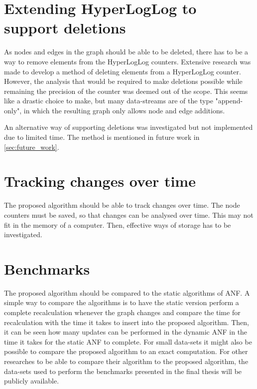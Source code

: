 \section{Extending HyperLogLog to support deletions}
As nodes and edges in the graph should be able to be deleted, there has to be a way to remove elements from the HyperLogLog counters. Extensive research was made to develop a method of deleting elements from a HyperLogLog counter. However, the analysis that would be required to make deletions possible while remaining the precision of the counter was deemed out of the scope. This seems like a drastic choice to make, but many data-streams are of the type "append-only", in which the resulting graph only allows node and edge additions.

An alternative way of supporting deletions was investigated but not implemented due to limited time. The method is mentioned in future work in \ref{sec:future_work}.


\section{Tracking changes over time}
The proposed algorithm should be able to track changes over time. The node counters must be saved, so that changes can be analysed over time. This may not fit in the memory of a computer. Then, effective ways of storage has to be investigated.


\section{Benchmarks} 
The proposed algorithm should be compared to the static algorithms of ANF.
A simple way to compare the algorithms is to have the static version perform a complete recalculation whenever the graph changes and compare the time for recalculation with the time it takes to insert into the proposed algorithm. Then,
it can be seen how many updates can be performed in the dynamic ANF in the time it takes for the static ANF to complete. For small data-sets it might also be possible to compare the proposed algorithm to an exact computation. For other researches to be able to compare their algorithm to the proposed algorithm, the data-sets used to perform the benchmarks presented in the final thesis will be publicly available.





